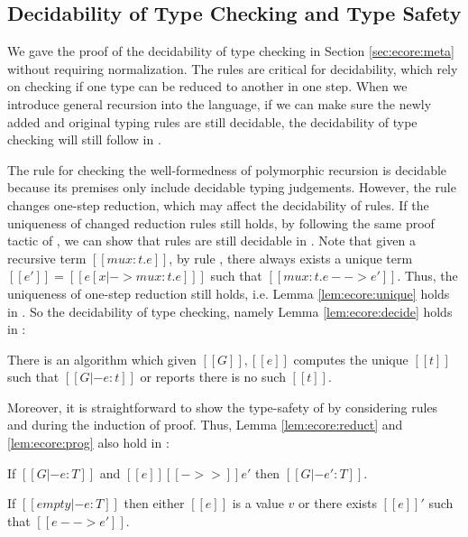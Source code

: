 \subsection{Decidability of Type Checking and Type Safety}\label{sec:rec:meta}
We gave the proof of the decidability of type checking \ecore in
Section \ref{sec:ecore:meta} without requiring normalization. The
\cast rules are critical for decidability, which rely on checking if
one type can be reduced to another in one step. When we introduce
general recursion into the language, if we can make sure the newly
added and original typing rules are still decidable, the decidability
of type checking will still follow in \name.

The rule  for checking the well-formedness of
polymorphic recursion is decidable because its premises only include
decidable typing judgements. However, the rule  changes
one-step reduction, which may affect the decidability of \cast
rules. If the uniqueness of changed reduction rules still holds, by
following the same proof tactic of \ecore, we can show that \cast
rules are still decidable in \name. Note that given a recursive term
$[[mu x:t.e]]$, by rule , there always exists a unique
term $[[e']]=[[e[x|->mu x:t.e] ]]$ such that $[[mu x:t.e -->
    e']]$. Thus, the uniqueness of one-step reduction still holds,
i.e. Lemma \ref{lem:ecore:unique} holds in \name. So the decidability
of type checking, namely Lemma \ref{lem:ecore:decide} holds in \name:

\begin{thm}\label{lem:rec:decide}
	There is an algorithm which given $[[G]], [[e]]$ computes the
        unique $[[t]]$ such that $[[G |- e:t]]$ or reports there is no
        such $[[t]]$.
\end{thm}

Moreover, it is straightforward to show the type-safety of \name by
considering rules  and  during the
induction of proof. Thus, Lemma \ref{lem:ecore:reduct} and
\ref{lem:ecore:prog} also hold in \name:

\begin{thm}\label{lem:rec:reduct}
If $[[G |- e:T]]$ and $[[e]] [[->>]] e'$ then $[[G |- e':T]]$.
\end{thm}

\begin{thm}[Progress]\label{lem:rec:prog}
If $[[empty |- e:T]]$ then either $[[e]]$ is a value $v$ or there
exists $[[e]]'$ such that $[[e --> e']]$.
\end{thm}
